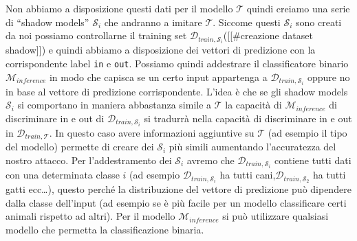 Non abbiamo a disposizione questi dati per il modello \(\mathcal T\)
quindi creiamo una serie di ``shadow models'' \(\mathcal S_i\) che
andranno a imitare \(\mathcal T\). Siccome questi \(\mathcal S_i\) sono
creati da noi possiamo controllarne il training set
\(\mathcal D_{train,\mathcal S_i}\)({[}{[}\#creazione dataset
shadow{]}{]}) e quindi abbiamo a disposizione dei vettori di predizione
con la corrispondente label \texttt{in} e \texttt{out}. Possiamo quindi
addestrare il classificatore binario \(\mathcal M_{inference}\) in modo
che capisca se un certo input appartenga a
\(\mathcal D_{train,\mathcal S_i}\) oppure no in base al vettore di
predizione corrispondente. L'idea è che se gli shadow models
\(\mathcal S_i\) si comportano in maniera abbastanza simile a
\(\mathcal T\) la capacità di \(\mathcal M_{inference}\) di discriminare
in e out di \(\mathcal D_{train,\mathcal S_i}\) si tradurrà nella
capacità di discriminare in e out in \(\mathcal D_{train,\mathcal T}\).
In questo caso avere informazioni aggiuntive su \(\mathcal T\) (ad
esempio il tipo del modello) permette di creare dei \(\mathcal S_i\) più
simili aumentando l'accuratezza del nostro attacco. Per l'addestramento
dei \(\mathcal S_i\) avremo che \(\mathcal D_{train,\mathcal S_i}\)
contiene tutti dati con una determinata classe \(i\) (ad esempio
\(\mathcal D_{train,\mathcal S_i}\) ha tutti
cani,\(\mathcal D_{train,\mathcal S_2}\) ha tutti gatti ecc\ldots),
questo perché la distribuzione del vettore di predizione può dipendere
dalla classe dell'input (ad esempio se è più facile per un modello
classificare certi animali rispetto ad altri). Per il modello
\(\mathcal M_{inference}\) si può utilizzare qualsiasi modello che
permetta la classificazione binaria.

